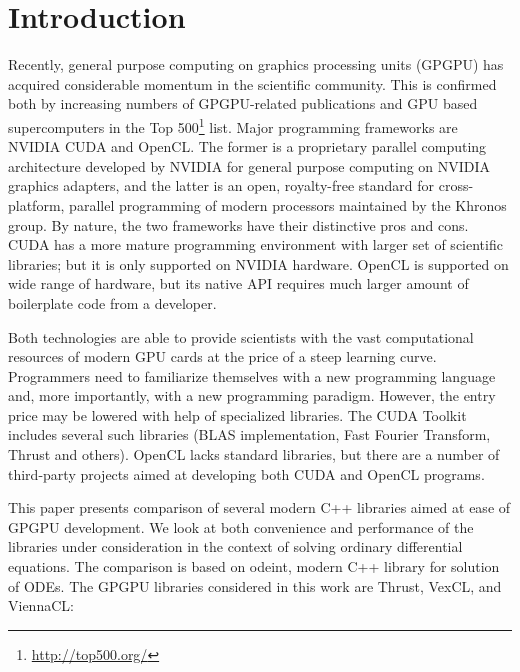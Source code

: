 \documentclass[1p]{elsarticle}
\begin{document}
%
%
\section{Introduction}

Recently, general purpose computing on graphics processing units (GPGPU) has
acquired considerable momentum in the scientific community. This is confirmed
both by increasing numbers of GPGPU-related publications and GPU based
supercomputers in the Top
500\footnote{\href{http://top500.org/}{http://top500.org/}} list. Major
programming frameworks are NVIDIA CUDA and OpenCL.  The former is a proprietary
parallel computing architecture developed by NVIDIA for general purpose
computing on NVIDIA graphics adapters, and the latter is an open, royalty-free
standard for cross-platform, parallel programming of modern processors
maintained by the Khronos group. By nature, the two frameworks have their
distinctive pros and cons. CUDA has a more mature programming environment with
larger set of scientific libraries; but it is only supported on NVIDIA
hardware. OpenCL is supported on wide range of hardware, but its native API
requires much larger amount of boilerplate code from a developer.

Both technologies are able to provide scientists with the vast computational
resources of modern GPU cards at the price of a steep learning curve.
Programmers need to familiarize
themselves with a new programming language and, more importantly, with a
new programming paradigm. However, the entry price may be lowered with help of
specialized libraries. The CUDA Toolkit includes several such libraries (BLAS
implementation, Fast Fourier Transform, Thrust and others). OpenCL lacks
standard libraries, but there are a number of third-party projects aimed at
developing both CUDA and OpenCL programs.

This paper presents comparison of several modern C++ libraries aimed at ease of
GPGPU development. We look at both convenience and performance of the libraries
under consideration in the context of solving ordinary differential equations.
The comparison is based on odeint, modern C++ library for solution of ODEs.
The GPGPU libraries considered in this work are Thrust, VexCL, and ViennaCL:

\end{document}
